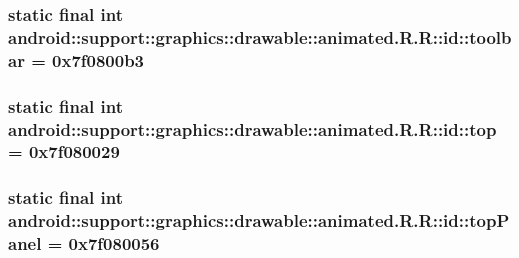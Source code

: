 \hypertarget{classandroid_1_1support_1_1graphics_1_1drawable_1_1animated_1_1_r_1_1id_0bcd34416bcb85d82d13a606c686a76c}{
\subsubsection[{toolbar}]{\setlength{\rightskip}{0pt plus 5cm}static final int android::support::graphics::drawable::animated.R.R::id::toolbar = 0x7f0800b3}}
\label{classandroid_1_1support_1_1graphics_1_1drawable_1_1animated_1_1_r_1_1id_0bcd34416bcb85d82d13a606c686a76c}


\hypertarget{classandroid_1_1support_1_1graphics_1_1drawable_1_1animated_1_1_r_1_1id_ef2164bdfb73673c8614fc942c4ba128}{
\subsubsection[{top}]{\setlength{\rightskip}{0pt plus 5cm}static final int android::support::graphics::drawable::animated.R.R::id::top = 0x7f080029}}
\label{classandroid_1_1support_1_1graphics_1_1drawable_1_1animated_1_1_r_1_1id_ef2164bdfb73673c8614fc942c4ba128}


\hypertarget{classandroid_1_1support_1_1graphics_1_1drawable_1_1animated_1_1_r_1_1id_e2c3f4abe62e9d101114e366aadc4491}{
\subsubsection[{topPanel}]{\setlength{\rightskip}{0pt plus 5cm}static final int android::support::graphics::drawable::animated.R.R::id::topPanel = 0x7f080056}}
\label{classandroid_1_1support_1_1graphics_1_1drawable_1_1animated_1_1_r_1_1id_e2c3f4abe62e9d101114e366aadc4491}


